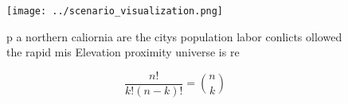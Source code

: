 \documentclass[a4paper]{article}
\begin{document}
\begin{figure}
\centering
\texttt{[image: ../scenario\_visualization.png]}
\caption{p a northern caliornia are the citys population labor conlicts ollowed the rapid mis Elevation proximity universe is re
}
\end{figure}
 
\[ \frac{n!}{k!(n-k)!} = \binom{n}{k} \]
\end{document}
